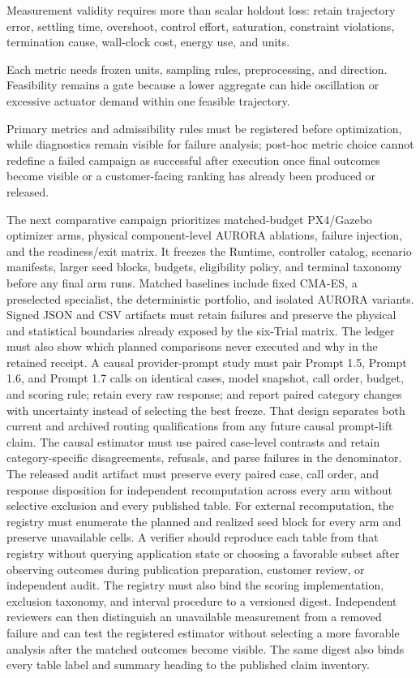 Measurement validity requires more than scalar holdout loss: retain
trajectory error, settling time, overshoot, control effort, saturation,
constraint violations, termination cause, wall-clock cost, energy use,
and units.

Each metric needs frozen units, sampling rules, preprocessing, and
direction. Feasibility remains a gate because a lower aggregate can hide
oscillation or excessive actuator demand within one feasible trajectory.

Primary metrics and
admissibility rules must be registered before optimization, while
diagnostics remain visible for failure
analysis; post-hoc metric choice cannot redefine a failed campaign as
successful after execution once final outcomes become visible or a
customer-facing ranking has already been produced or released.

The next comparative campaign prioritizes matched-budget PX4/Gazebo
optimizer arms, physical component-level AURORA ablations, failure
injection, and the readiness/exit matrix. It freezes the Runtime,
controller catalog, scenario manifests, larger seed blocks, budgets,
eligibility policy, and terminal taxonomy before any final arm runs.
Matched baselines include fixed CMA-ES, a preselected specialist, the
deterministic portfolio, and isolated AURORA variants. Signed JSON and
CSV artifacts must retain failures and preserve the physical and
statistical boundaries already exposed by the six-Trial matrix. The
ledger must also show which planned comparisons never executed and why
in the retained receipt. A
causal provider-prompt study must pair Prompt 1.5, Prompt 1.6, and Prompt
1.7 calls on identical cases, model snapshot, call order, budget, and
scoring rule; retain every raw response; and report paired category
changes with uncertainty instead of selecting the best freeze. That design
separates both current and archived routing qualifications from any future
causal prompt-lift claim. The causal estimator must use paired case-level contrasts and
retain category-specific disagreements, refusals, and parse failures in
the denominator. The released audit artifact must preserve every paired
case, call order, and response disposition for independent recomputation
across every arm without selective exclusion and every published table.
For external recomputation, the registry must enumerate the planned and
realized seed block for every arm and preserve unavailable cells. A
verifier should reproduce each table from that registry without querying
application state or choosing a favorable subset after observing outcomes
during publication preparation, customer review, or independent audit. The
registry must also bind the scoring implementation, exclusion taxonomy, and
interval procedure to a versioned digest. Independent reviewers can then
distinguish an unavailable measurement from a removed failure and can test
the registered estimator without selecting a more favorable analysis after
the matched outcomes become visible.
The same digest also binds every table label and summary heading to the
published claim inventory.

